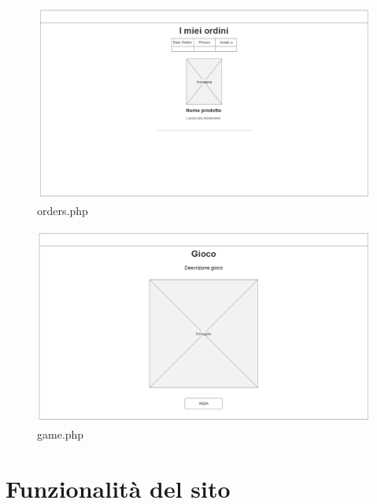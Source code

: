 \documentclass[12pt]{extarticle}
\begin{document}
\begin{figure}
    \includegraphics[width=\linewidth]{mocanu/mockup/Ordini.png}
    \caption{orders.php}
    \label{fig:orders.php}
\end{figure}
\begin{figure}
    \includegraphics[width=\linewidth]{mocanu/mockup/Gioco.png}
    \caption{game.php}
    \label{fig:game.php}
\end{figure}



\section{Funzionalità del sito}
\end{document}
